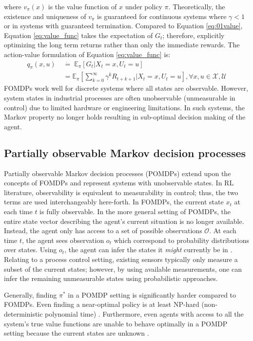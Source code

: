 where $v_\pi (x)$ is the value function of $x$ under policy $\pi$. Theoretically, the existence and uniqueness of $v_{\pi}$ is guaranteed for continuous systems where $\gamma < 1$ or in systems with guaranteed termination.  Compared to Equation \ref{eq:01value}, Equation \ref{eq:value_func} takes the expectation of $G_t$; therefore, explicitly optimizing the long term returns rather than only the immediate rewards. The action-value formulation of Equation \ref{eq:value_func} is:
\begin{align}
    q_\pi (x, u) \; &\dot{=} \; \mathbb{E}_\pi [G_t | X_t = x, U_t = u] \\
                 &= \mathbb{E}_\pi \left[\sum\limits^\infty_{k=0} \gamma^k R_{t+k+1} | X_t = x, U_t = u \right], \forall x, u \in \mathcal{X, U}
    \label{eq:a_value_func}
\end{align}
FOMDPs work well for discrete systems where all states are observable.  However, system states in industrial processes are often unobservable (unmeasurable in control) due to limited hardware or engineering limitations. In such systems, the Markov property no longer holds resulting in sub-optimal decision making of the agent.





\subsection{Partially observable Markov decision processes}
Partially observable Markov decision processes (POMDPs) extend upon the concepts of FOMDPs and represent systems with unobservable states. In RL literature, observability is equivalent to measurability in control; thus, the two terms are used interchangeably here-forth. In FOMDPs, the current state $x_t$ at each time $t$ is fully observable. In the more general setting of POMDPs, the entire state vector describing the agent's current situation is no longer available. Instead, the agent only has access to a set of possible observations $\mathcal{O}$. At each time $t$, the agent sees observation $o_t$ which correspond to probability distributions over states.  Using $o_t$, the agent can infer the states it \textit{might} currently be in \cite{ng_ref12}. Relating to a process control setting, existing sensors typically only measure a subset of the current states; however, by using available measurements, one can infer the remaining unmeasurable states using probabilistic approaches.

Generally, finding $\pi^*$ in a POMDP setting is significantly harder compared to FOMDPs.  Even finding a near-optimal policy is at least NP-hard (non-deterministic polynomial time) \cite{pomdp_time}.  Furthermore, even agents with access to all the system's true value functions are unable to behave optimally in a POMDP setting because the current states are unknown \cite{ng_ref12}. 


